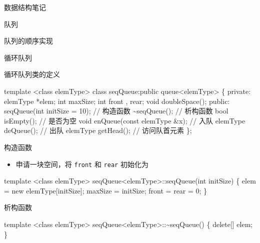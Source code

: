 \documentclass[
  ignorenonframetext,
]{beamer}
\newenvironment{Shaded}{}{}
\newcommand{\NormalTok}[1]{#1}
\providecommand{\tightlist}{%
  \setlength{\itemsep}{0pt}\setlength{\parskip}{0pt}}
\begin{document}
\begin{frame}[fragile]{数据结构笔记}
\begin{block}{队列}
\begin{block}{队列的顺序实现}
\begin{block}{循环队列}
\begin{block}{循环队列类的定义}
\protect{}\label{ux5faaux73afux961fux5217ux7c7bux7684ux5b9aux4e49}
\begin{Shaded}
\begin{Highlighting}[]
\NormalTok{template \textless{}class elemType\textgreater{}}
\NormalTok{class seqQueue:public queue\textless{}elemType\textgreater{}}
\NormalTok{\{}
\NormalTok{  private:}
\NormalTok{    elemType *elem;}
\NormalTok{    int maxSize;}
\NormalTok{    int front , rear;}
\NormalTok{    void doubleSpace();}
\NormalTok{  public:}
\NormalTok{    seqQueue(int initSize = 10);        // 构造函数}
\NormalTok{    \textasciitilde{}seqQueue();                        // 析构函数}
\NormalTok{    bool isEmpty();                     // 是否为空}
\NormalTok{    void enQueue(const elemType \&x);    // 入队}
\NormalTok{    elemType deQueue();                 // 出队}
\NormalTok{    elemType getHead();                 // 访问队首元素}
\NormalTok{\};}
\end{Highlighting}
\end{Shaded}
\end{block}

\begin{block}{构造函数}
\protect{}\label{ux6784ux9020ux51fdux6570-5}
\begin{itemize}
\tightlist
\item
  申请一块空间，将 \texttt{front} 和 \texttt{rear} 初始化为 {}
\end{itemize}

\begin{Shaded}
\begin{Highlighting}[]
\NormalTok{template \textless{}class elemType\textgreater{}}
\NormalTok{seqQueue\textless{}elemType\textgreater{}::seqQueue(int initSize)}
\NormalTok{\{}
\NormalTok{  elem = new elemType[initSize];}
\NormalTok{  maxSize = initSize;}
\NormalTok{  front = rear = 0;}
\NormalTok{\}}
\end{Highlighting}
\end{Shaded}
\end{block}

\begin{block}{析构函数}
\protect{}\label{ux6790ux6784ux51fdux6570-3}
\begin{Shaded}
\begin{Highlighting}[]
\NormalTok{template \textless{}class elemType\textgreater{}}
\NormalTok{seqQueue\textless{}elemType\textgreater{}::\textasciitilde{}seqQueue()}
\NormalTok{\{}
\NormalTok{  delete[] elem;}
\NormalTok{\}}
\end{Highlighting}
\end{Shaded}
\end{block}


\end{block}
\end{block}
\end{block}
\end{frame}
\end{document}
